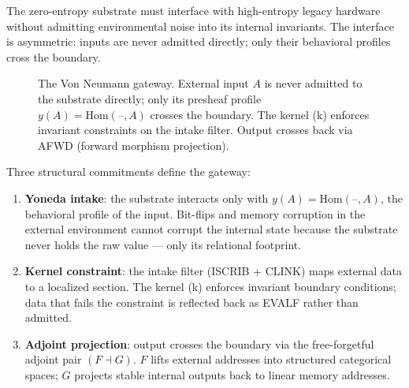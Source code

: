 \documentclass[12pt,a4paper]{article}
\begin{document}
The zero-entropy substrate must interface with high-entropy legacy hardware
without admitting environmental noise into its internal invariants. The
interface is asymmetric: inputs are never admitted directly; only their
behavioral profiles cross the boundary.

\begin{figure}[htbp]
\centering
{}
\caption{The Von Neumann gateway. External input $A$ is never admitted to
the substrate directly; only its presheaf profile $y(A) = \mathrm{Hom}(\text{--},A)$
crosses the boundary. The kernel (k) enforces invariant constraints on the
intake filter. Output crosses back via AFWD (forward morphism projection).}
\label{fig:vn_gateway}
\end{figure}

Three structural commitments define the gateway:

\begin{enumerate}
\item \textbf{Yoneda intake}: the substrate interacts only with $y(A) =
  \mathrm{Hom}(\text{--}, A)$, the behavioral profile of the input.
  Bit-flips and memory corruption in the external environment cannot
  corrupt the internal state because the substrate never holds the raw
  value --- only its relational footprint.
\item \textbf{Kernel constraint}: the intake filter (ISCRIB + CLINK) maps
  external data to a localized section. The kernel (k) enforces invariant
  boundary conditions; data that fails the constraint is reflected back as
  EVALF rather than admitted.
\item \textbf{Adjoint projection}: output crosses the boundary via the
  free-forgetful adjoint pair $(F \dashv G)$. $F$ lifts external addresses
  into structured categorical spaces; $G$ projects stable internal outputs
  back to linear memory addresses.
\end{enumerate}
\end{document}
